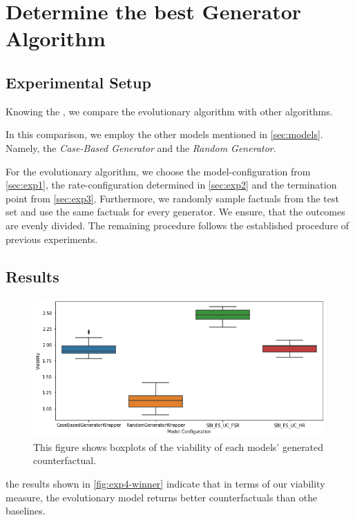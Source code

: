 \documentclass[./../../paper.tex]{subfiles}
\begin{document}
\section{Determine the best Generator Algorithm}

\subsection{Experimental Setup}
\label{sec:exp4}
Knowing the , we compare the evolutionary algorithm with other algorithms. 

In this comparison, we employ the other models mentioned in \autoref{sec:models}. Namely, the \emph{Case-Based Generator} and the \emph{Random Generator}. 

For the evolutionary algorithm, we choose the model-configuration from \autoref{sec:exp1}, the rate-configuration determined in \autoref{sec:exp2} and the termination point from \autoref{sec:exp3}. Furthermore, we randomly sample  factuals from the test set and use the same factuals for every generator. We ensure, that the outcomes are evenly divided. The remaining procedure follows the established procedure of previous experiments.

\subsection{Results}
\begin{figure}[htbp]
    \centering
    \includegraphics[width=\textwidth]{figures/generated/exp4_winner_figure_side.png}
    \caption{This figure shows boxplots of the viability of each models' generated counterfactual.}
    \label{fig:exp4-winner}
\end{figure}

\noindent the results shown in \autoref{fig:exp4-winner} indicate that in terms of our viability measure, the evolutionary model returns better counterfactuals than othe baselines. 
\end{document}
